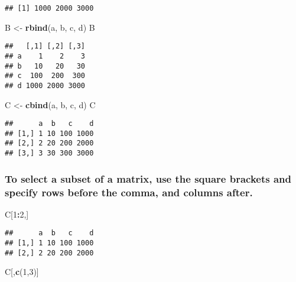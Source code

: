 \documentclass[]{article}
\newenvironment{Shaded}{\begin{snugshade}}{\end{snugshade}}
\newcommand{\KeywordTok}[1]{\textcolor[rgb]{0.13,0.29,0.53}{\textbf{#1}}}
\newcommand{\DecValTok}[1]{\textcolor[rgb]{0.00,0.00,0.81}{#1}}
\newcommand{\StringTok}[1]{\textcolor[rgb]{0.31,0.60,0.02}{#1}}
\newcommand{\OperatorTok}[1]{\textcolor[rgb]{0.81,0.36,0.00}{\textbf{#1}}}
\newcommand{\NormalTok}[1]{#1}
\begin{document}
\begin{verbatim}
## [1] 1000 2000 3000
\end{verbatim}

\begin{Shaded}
\begin{Highlighting}[]
\NormalTok{B <-}\StringTok{ }\KeywordTok{rbind}\NormalTok{(a, b, c, d)}
\NormalTok{B}
\end{Highlighting}
\end{Shaded}

\begin{verbatim}
##   [,1] [,2] [,3]
## a    1    2    3
## b   10   20   30
## c  100  200  300
## d 1000 2000 3000
\end{verbatim}

\begin{Shaded}
\begin{Highlighting}[]
\NormalTok{C <-}\StringTok{ }\KeywordTok{cbind}\NormalTok{(a, b, c, d)}
\NormalTok{C}
\end{Highlighting}
\end{Shaded}

\begin{verbatim}
##      a  b   c    d
## [1,] 1 10 100 1000
## [2,] 2 20 200 2000
## [3,] 3 30 300 3000
\end{verbatim}

\subsubsection{To select a subset of a matrix, use the square brackets
and specify rows before the comma, and columns
after.}\label{to-select-a-subset-of-a-matrix-use-the-square-brackets-and-specify-rows-before-the-comma-and-columns-after.}

\begin{Shaded}
\begin{Highlighting}[]
\NormalTok{C[}\DecValTok{1}\OperatorTok{:}\DecValTok{2}\NormalTok{,]}
\end{Highlighting}
\end{Shaded}

\begin{verbatim}
##      a  b   c    d
## [1,] 1 10 100 1000
## [2,] 2 20 200 2000
\end{verbatim}

\begin{Shaded}
\begin{Highlighting}[]
\NormalTok{C[,}\KeywordTok{c}\NormalTok{(}\DecValTok{1}\NormalTok{,}\DecValTok{3}\NormalTok{)]}
\end{Highlighting}
\end{Shaded}
\end{document}
